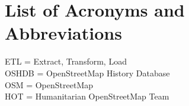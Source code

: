 \chapter*{List of Acronyms and Abbreviations}

ETL = Extract, Transform, Load \\
OSHDB = OpenStreetMap History Database \\
OSM = OpenStreetMap \\
HOT = Humanitarian OpenStreetMap Team \\
